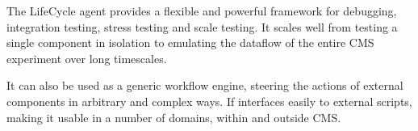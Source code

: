 The LifeCycle agent provides a flexible and powerful framework for debugging, integration testing, stress testing and scale testing. It scales well from testing a single component in isolation to emulating the dataflow of the entire CMS experiment over long timescales.

It can also be used as a generic workflow engine, steering the actions of external components in arbitrary and complex ways. If interfaces easily to external scripts, making it usable in a number of domains, within and outside CMS.